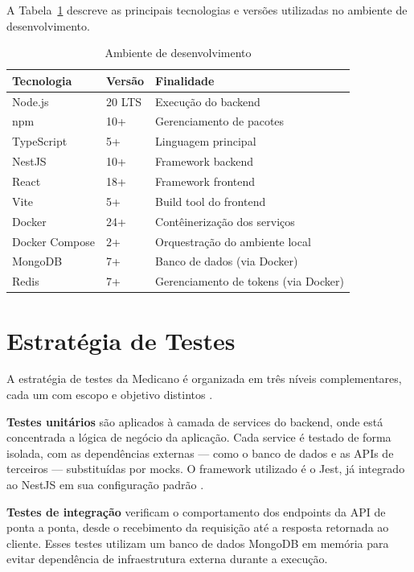A Tabela~\ref{tab:environment} descreve as principais
tecnologias e versões utilizadas no ambiente de
desenvolvimento.

\begin{table}[H]
  \centering
  \caption{Ambiente de desenvolvimento}
  \label{tab:environment}
  \begin{tabular}{lll}
    \toprule
    \textbf{Tecnologia} &
    \textbf{Versão} &
    \textbf{Finalidade} \\
    \midrule
    Node.js          & 20 LTS   & Execução do backend \\
    npm              & 10+      & Gerenciamento de pacotes \\
    TypeScript       & 5+       & Linguagem principal \\
    NestJS           & 10+      & Framework backend \\
    React            & 18+      & Framework frontend \\
    Vite             & 5+       & Build tool do frontend \\
    Docker           & 24+      & Contêinerização dos serviços \\
    Docker Compose   & 2+       & Orquestração do ambiente local \\
    MongoDB          & 7+       & Banco de dados (via Docker) \\
    Redis            & 7+       & Gerenciamento de tokens (via Docker) \\
    \bottomrule
  \end{tabular}
\end{table}

\section{Estratégia de Testes}
\label{sec:testing-strategy}

A estratégia de testes da Medicano é organizada em
três níveis complementares, cada um com escopo e
objetivo distintos \cite{sommerville2011}.

\textbf{Testes unitários} são aplicados à camada de
services do backend, onde está concentrada a lógica
de negócio da aplicação. Cada service é testado de
forma isolada, com as dependências externas — como
o banco de dados e as APIs de terceiros —
substituídas por mocks. O framework utilizado é o
Jest, já integrado ao NestJS em sua configuração
padrão \cite{jestjs2024}.

\textbf{Testes de integração} verificam o
comportamento dos endpoints da API de ponta a ponta,
desde o recebimento da requisição até a resposta
retornada ao cliente. Esses testes utilizam um banco
de dados MongoDB em memória para evitar dependência
de infraestrutura externa durante a execução.

